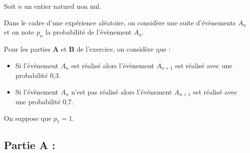 Soit $n$ un entier naturel non nul.

Dans le cadre d'une expérience aléatoire, on considère une suite d'évènements $A_{n}$ et on note $p_{n}$ la probabilité de l'évènement $A_{n}$.

Pour les parties \textbf{A} et \textbf{B} de l'exercice, on considère que :

\begin{itemize}
\item Si l'évènement $A_{n}$ est réalisé alors l'évènement $A_{n+1}$ est réalisé avec une probabilité 0,3.
\item Si l'évènement $A_{n}$ n'est pas réalisé alors l'évènement $A_{n+1}$ est réalisé avec une probabilité 0,7.
\end{itemize}

On suppose que $p_{1}=1$.

\subsection*{Partie A :}

